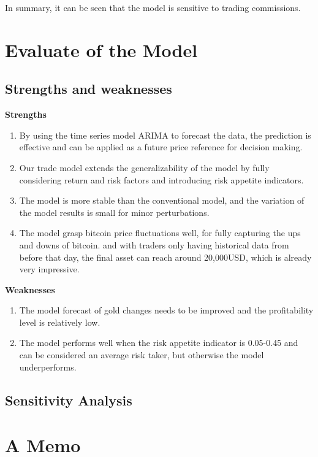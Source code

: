 \documentclass{mcmthesis}
\begin{document}
In summary, it can be seen that the model is sensitive to trading commissions.


\section{Evaluate of the Model}
\subsection{Strengths and weaknesses}
\textbf{Strengths}
\begin{enumerate}    %
  \item By using the time series model ARIMA to forecast the data, the prediction is effective and can be applied as a future price reference for decision making.
  \item Our trade model extends the generalizability of the model by fully considering return and risk factors and introducing risk appetite indicators.
  \item The model is more stable than the conventional model, and the variation of the model results is small for minor perturbations.
  \item The model grasp bitcoin price fluctuations well, for fully capturing the ups and downs of bitcoin.
  and with traders only having historical data from before that day, the final asset can reach around 20,000USD, which is already very impressive.
\end{enumerate}

\textbf{Weaknesses}
\begin{enumerate}    %
  \item The model forecast of gold changes needs to be improved and the profitability level is relatively low.
  \item The model performs well when the risk appetite indicator is 0.05-0.45 and can be considered an average risk taker, but otherwise the model underperforms.
\end{enumerate}




\subsection{Sensitivity Analysis}





\section{A Memo}
\end{document}
